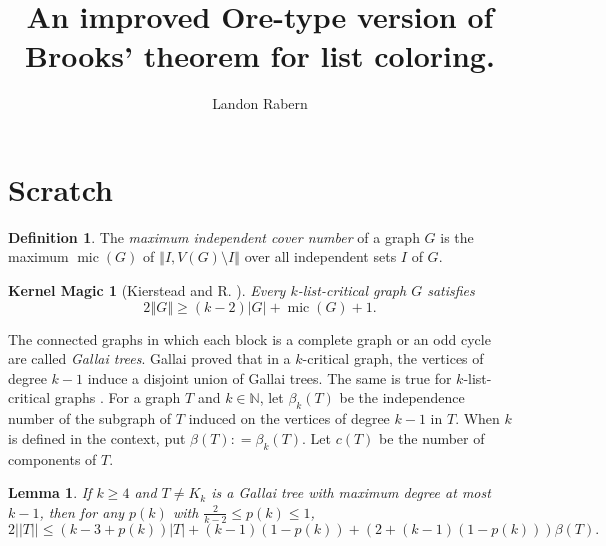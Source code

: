 \documentclass[12pt]{article}
\title{An improved Ore-type version of Brooks' theorem for list coloring.}
\author{Landon Rabern}
\theoremstyle{plain}
\newtheorem{lem}[thm]{Lemma}
\newtheorem*{KernelMagic}{Kernel Magic}
\theoremstyle{definition}
\newtheorem*{TheDefinition}{Definition}
\theoremstyle{remark}
\newcommand{\IN}{\mathbb{N}}
\newcommand{\card}[1]{\left|#1\right|}
\newcommand{\size}[1]{\left\Vert#1\right\Vert}
\newcommand{\parens}[1]{\left( #1 \right)}
\newcommand{\DefinedAs}{\mathrel{\mathop:}=}
\newcommand{\mic}{\operatorname{mic}}
\begin{document}
\maketitle

\section{Scratch}
\begin{TheDefinition} The \emph{maximum independent cover number }of a graph $G$
	is the maximum $\mic(G)$ of $\size{I, V(G) \setminus I}$ over all independent sets $I$
	of $G$. 
\end{TheDefinition}

\begin{KernelMagic}[Kierstead and R. \cite{KernelMagic}]\label{ConsantListMicStrength} 
	Every $k$-list-critical graph $G$ satisfies
	\[2\size{G} \ge (k-2)\card{G} + \mic(G) + 1.\]
\end{KernelMagic}

The connected graphs in which each block is a complete graph
or an odd cycle are called \emph{Gallai trees}.  Gallai \cite{gallai1963kritische} proved that in a $k$-critical graph, the vertices of degree $k-1$ induce a disjoint union of Gallai trees.  
The same is true for $k$-list-critical graphs \cite{borodin1977criterion, erdos1979choosability}.  For a graph $T$ and $k \in \IN$, let $\beta_k(T)$ be the independence number of the subgraph of $T$ 
induced on the vertices of degree $k-1$ in $T$.  When $k$ is defined in the context, put $\beta(T) 
\DefinedAs \beta_k(T)$.  Let $c(T)$ be the number of components of $T$.

\begin{lem}\label{BetaBoundGeneral}
	If $k \ge 4$ and $T \ne K_k$ is a Gallai tree with maximum degree at most $k-1$, then for any $p(k)$ with $\frac{2}{k-2} \le p(k) \le 1$,
	\[2||T|| \le \parens{k-3 + p(k)}|T| + (k-1)(1-p(k)) + (2 + (k-1)(1-p(k)))\beta(T).\]
\end{lem}
\end{document}
